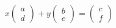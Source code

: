 \documentclass[preview]{standalone}
\begin{document}
\begin{align*}
x \begin{pmatrix} a \\ d \end{pmatrix} + y \begin{pmatrix} b \\ e \end{pmatrix} = \begin{pmatrix} c \\ f \end{pmatrix}
\end{align*}
\end{document}
